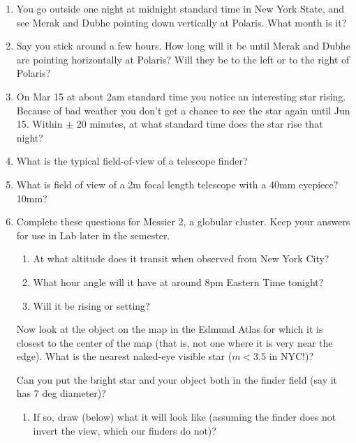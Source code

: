 
\begin{enumerate}
\item You go outside one night at midnight standard time in New York
  State, and see Merak and Dubhe pointing down vertically at
  Polaris. What month is it? 
\vspace{80pt}
\item Say you stick around a few hours.  How long will it be until
  Merak and Dubhe are pointing horizontally at Polaris?  Will they be
  to the left or to the right of Polaris?
\vspace{80pt}
\item On Mar 15 at about 2am standard time you notice an interesting
  star rising.  Because of bad weather you don’t get a chance to see
  the star again until Jun 15.  Within $\pm$ 20 minutes, at what
  standard time does the star rise that night?
\vspace{80pt}
\item What is the typical field-of-view of a telescope finder?
\vspace{80pt}
\item What is field of view of a 2m focal length telescope with a 40mm
  eyepiece? 10mm?
\clearpage
\item Complete these questions for Messier 2, a globular cluster. Keep your answers for
  use in Lab later in the semester.
  \begin{enumerate}
    \item At what altitude does it transit when observed from New York City?
\item What hour angle will it have at around 
8pm Eastern Time tonight?
\item Will it be rising or setting?
\end{enumerate}
\vspace{20pt}

Now look at the object on the map in the Edmund Atlas for which it is closest
to the center of the map (that is, not one where it is very near the
edge). What is the nearest naked-eye visible star ($m<3.5$ in NYC!)?

\vspace{40pt}

Can you put the bright star and your object both in the finder
field (say it has 7 deg diameter)? 

\vspace{20pt}

\begin{enumerate}
\item If so, draw (below) what it will look like
(assuming the finder does not invert the view, which our finders do
not)?
  \end{enumerate}
\end{enumerate}
